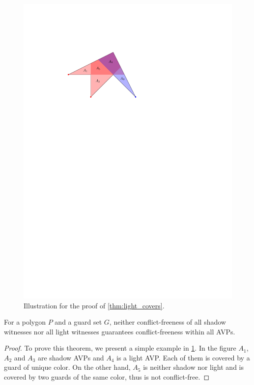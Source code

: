\begin{figure}[htbp]
\centering
\includegraphics[scale=1.3]{Thesis/figures/conflict-free_witnesses.pdf}
\caption{Illustration for the proof of \cref{thm:light_covers}.}
\label{fig:light_covers}
\end{figure}

\begin{theorem}\label{thm:light_covers}
For a polygon $P$ and a guard set $G$, neither conflict-freeness of all shadow witnesses nor all light witnesses guarantees conflict-freeness within all AVPs.
\end{theorem}
\begin{proof}
To prove this theorem, we present a simple example in \cref{fig:light_covers}. In the figure $A_{1}$, $A_{2}$ and $A_{3}$ are shadow AVPs and $A_{4}$ is a light AVP. Each of them is covered by a guard of unique color. On the other hand, $A_{5}$ is neither shadow nor light and is covered by two guards of the same color, thus is not conflict-free.
\end{proof}

